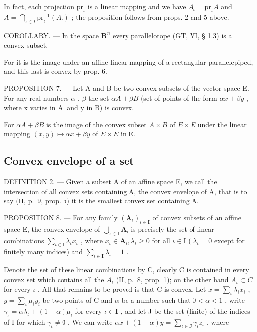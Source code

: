 In fact, each projection \(\mathrm{pr}_{\iota}\) is a linear mapping and we have \(A_{\iota} = \mathrm{pr}_{\iota}A\) and \(A = \bigcap_{\iota \in I} \mathrm{pr}_{\iota}^{-1}(A_{\iota})\) ; the proposition follows from props. 2 and 5 above.

COROLLARY. --- In the space \(\mathbf{R}^n\) every parallelotope (GT, VI, § 1.3) is a convex subset.

For it is the image under an affine linear mapping of a rectangular parallelepiped, and this last is convex by prop. 6.

PROPOSITION 7. --- Let A and B be two convex subsets of the vector space E. For any real numbers \(\alpha\) , \(\beta\) the set \(\alpha A + \beta B\) (set of points of the form \(\alpha x + \beta y\) , where x varies in A, and y in B) is convex.

For \(\alpha A + \beta B\) is the image of the convex subset \(A \times B\) of \(E \times E\) under the linear mapping \((x, y) \mapsto \alpha x + \beta y\) of \(E \times E\) in E.

\subsection{Convex envelope of a set}

DEFINITION 2. --- Given a subset A of an affine space E, we call the intersection of all convex sets containing A, the convex envelope of A, that is to say (II, p.~9, prop. 5) it is the smallest convex set containing A.

PROPOSITION 8. --- For any family \((\mathbf{A}_{\iota})_{\iota \in \mathbf{I}}\) of convex subsets of an affine space E, the convex envelope of \(\bigcup_{\iota \in \mathbf{I}}\mathbf{A}_{\iota}\) is precisely the set of linear combinations \(\sum_{\iota \in \mathbf{I}}\lambda_{\iota}x_{\iota}\) , where \(x_{\iota}\in \mathbf{A}_{\iota},\lambda_{\iota}\geqslant 0\) for all \(\iota \in \mathrm{I}\) ( \(\lambda_{\iota} = 0\) except for finitely many indices) and \(\sum_{\iota \in \mathbf{I}}\lambda_{\iota} = 1\) .

Denote the set of these linear combinations by C, clearly C is contained in every convex set which contains all the \(A_{\iota}\) (II, p.~8, prop. 1); on the other hand \(A_{\iota} \subset C\) for every \(\iota\) . All that remains to be proved is that C is convex. Let \(x = \sum_{i} \lambda_{i} x_{i}\) , \(y = \sum_{i} \mu_{i} y_{i}\) be two points of C and \(\alpha\) be a number such that \(0 < \alpha < 1\) , write \(\gamma_{\iota} = \alpha \lambda_{\iota} + (1 - \alpha)\mu_{\iota}\) for every \(\iota \in \mathbf{I}\) , and let J be the set (finite) of the indices of I for which \(\gamma_{\iota} \neq 0\) . We can write \(\alpha x + (1 - \alpha)y = \sum_{\iota \in \mathbf{J}}\gamma_{\iota}z_{\iota}\) , where

